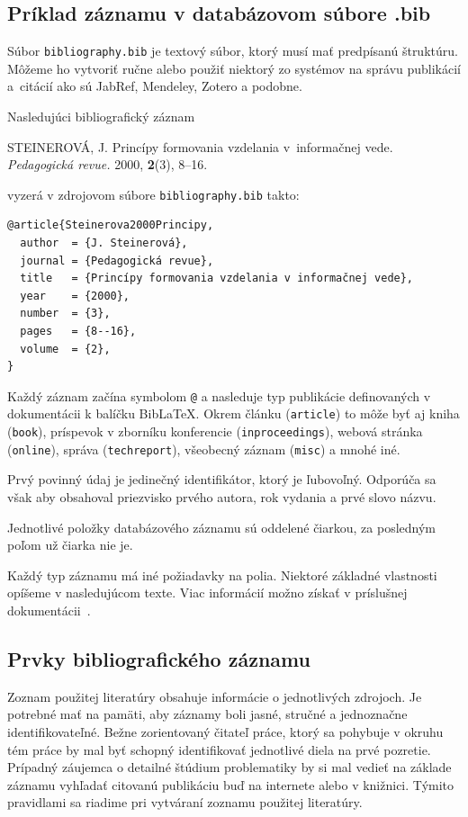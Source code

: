 \subsection{Príklad záznamu v databázovom súbore .bib}\label{sec:citExample}
Súbor \texttt{bibliography.bib} je textový súbor, ktorý musí mať predpísanú štruktúru.
Môžeme ho vytvoriť ručne alebo použiť niektorý zo systémov na správu publikácií a~citácií ako sú JabRef, Mendeley, Zotero a podobne.

Nasledujúci bibliografický záznam
\begin{trivlist}
  \item STEINEROVÁ, J. Princípy formovania vzdelania
  v~informačnej vede. \textit{Pedagogická revue.} 2000, \textbf{2}(3), 8--16.
\end{trivlist}
vyzerá v zdrojovom súbore \texttt{bibliography.bib} takto:
\begin{verbatim}
@article{Steinerova2000Principy,
  author  = {J. Steinerová},
  journal = {Pedagogická revue},
  title   = {Princípy formovania vzdelania v informačnej vede},
  year    = {2000},
  number  = {3},
  pages   = {8--16},
  volume  = {2},
}
\end{verbatim}

Každý záznam začína symbolom \verb|@| a nasleduje typ publikácie definovaných v dokumentácii k balíčku Bib\LaTeX.
Okrem článku (\verb|article|) to môže byť aj kniha (\verb|book|),
príspevok v zborníku konferencie (\verb|inproceedings|),
webová stránka (\verb|online|),
správa (\verb|techreport|),
všeobecný záznam (\verb|misc|) a mnohé iné.

Prvý povinný údaj je jedinečný identifikátor, ktorý je ľubovoľný.
Odporúča sa však aby obsahoval priezvisko prvého autora, rok vydania a prvé slovo názvu.

Jednotlivé položky databázového záznamu sú oddelené čiarkou,
za posledným poľom už čiarka nie je.

Každý typ záznamu má iné požiadavky na polia.
Niektoré základné vlastnosti opíšeme v nasledujúcom texte.
Viac informácií možno získať v príslušnej dokumentácii~\cite{Hoftich2022iso690}.

\subsection{Prvky bibliografického záznamu}
Zoznam použitej literatúry obsahuje informácie o jednotlivých zdrojoch. Je potrebné mať na pamäti, aby záznamy boli jasné, stručné a jednoznačne identifikovateľné. Bežne zorientovaný čitateľ práce, ktorý sa pohybuje v okruhu tém práce by mal byť schopný identifikovať jednotlivé diela na prvé pozretie. Prípadný záujemca o detailné štúdium problematiky by si mal vedieť na základe záznamu vyhľadať citovanú publikáciu buď na internete alebo v knižnici. Týmito pravidlami sa riadime pri vytváraní zoznamu použitej literatúry.

